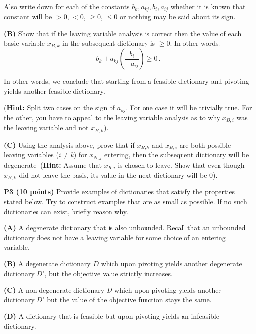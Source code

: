 \documentclass[11pt]{article}
\begin{document}
Also write down for each of the constants $b_k, a_{kj}, b_i, a_{ij}$
whether it is known that constant will be $> 0$, $< 0$, $\geq 0$,
$\leq 0$ or nothing may be said about its sign.

\medskip

\noindent \textbf{(B)} Show that if the leaving variable analysis is
correct then  the value of each basic variable $x_{B,k}$ in the
subsequent 
dictionary is  $\geq 0$. In other words: 
\[  b_k + a_{kj} \left(\frac{b_i}{ - a_{ij}}\right)  \geq 0 \,.\]

In other words, we conclude that starting from a feasible dictionary
and pivoting yields another feasible dictionary.

(\textbf{Hint:} Split two cases on the sign of $a_{kj}$. For one case
it will be trivially true. For the other, you have to appeal to the
leaving variable analysis as to why $x_{B,i}$ was the leaving variable and
not $x_{B,k}$).

\medskip


\noindent\textbf{(C)} Using the analysis above, prove that if $x_{B,k}$
and $x_{B,i}$ are both possible leaving variables ($i \not= k$) for $x_{N,j}$ entering,
then  the subsequent dictionary will be degenerate.  (\textbf{Hint:}
Assume that $x_{B,i}$ is chosen to leave. Show that even though $x_{B,k}$ did not leave the basis, its value in
the  next dictionary will be $0$).

\bigskip

\noindent\textbf{P3 (10 points)}  Provide examples of dictionaries
that satisfy the properties stated below. Try to construct
examples that are as small as possible. If no such
dictionaries can exist, briefly reason why.


\noindent\textbf{(A)} A degenerate dictionary that is also unbounded. 
Recall that an unbounded dictionary does not have a leaving variable for some
choice of an entering variable.

\medskip

\noindent\textbf{(B)} A degenerate dictionary $D$ which upon pivoting
yields another degenerate dictionary $D'$, but the objective value strictly
increases.

\medskip

\noindent\textbf{(C)} A non-degenerate dictionary $D$ which upon pivoting
yields another dictionary $D'$ but the value of the objective function
stays the same.

\medskip

\noindent\textbf{(D)} A dictionary that is feasible but upon pivoting
yields an infeasible dictionary.
\end{document}
